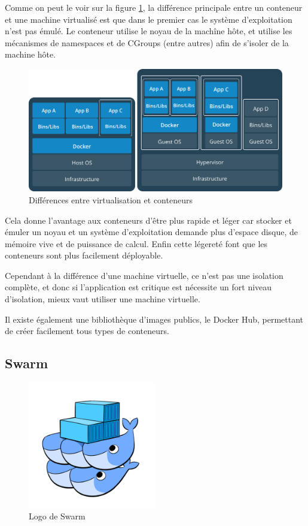 Comme on peut le voir sur la figure \ref{fig:diffvm}, la différence principale entre un conteneur 
et une machine virtualisé est que dans le premier cas le système d'exploitation n'est pas émulé.
Le conteneur utilise le noyau de la machîne hôte, et utilise les mécanismes de namespaces et de 
CGroups (entre autres) afin de s'isoler de la machine hôte.

\begin{figure}
    \centering
    \includegraphics[width=\textwidth]{img/vm-container}
    \caption{Différences entre virtualisation et conteneurs}
    \label{fig:diffvm}
\end{figure}

Cela donne l'avantage aux conteneurs d'être plus rapide et léger car stocker et émuler un noyau
et un système d'exploitation demande plus d'espace disque, de mémoire vive et de puissance de
calcul. Enfin cette légereté font que les conteneurs sont plus facilement déployable.

Cependant à la différence d'une machine virtuelle, ce n'est pas une isolation complète, et donc
si l'application est critique est nécessite un fort niveau d'isolation, mieux vaut utiliser une
machine virtuelle.\newline

Il existe également une bibliothèque d’images publics, le Docker Hub, permettant de créer
facilement tous types de conteneurs.

\subsection{Swarm}

\begin{figure}[h!]
    \centering
    \includegraphics[width=0.5\textwidth]{img/swarm}
    \caption{Logo de Swarm}
\end{figure}

